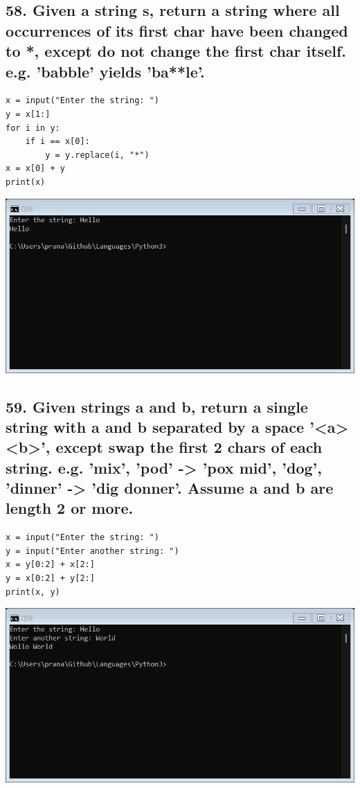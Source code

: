 \documentclass[12pt]{article}
\begin{document}
\subsection*{58. Given a string s, return a string where all occurrences of its first char have been changed to *, except do not change the first char itself. e.g. 'babble' yields 'ba**le'.}
\begin{verbatim}
x = input("Enter the string: ")
y = x[1:]
for i in y:
    if i == x[0]:
        y = y.replace(i, "*")
x = x[0] + y
print(x)
\end{verbatim}
\includegraphics[width=\linewidth]{images/58.png}

\subsection*{59. Given strings a and b, return a single string with a and b separated by a space '<a> <b>', except swap the first 2 chars of each string. e.g. 'mix', 'pod' -> 'pox mid', 'dog', 'dinner' -> 'dig donner'. Assume a and b are length 2 or more.}
\begin{verbatim}
x = input("Enter the string: ")
y = input("Enter another string: ")
x = y[0:2] + x[2:]
y = x[0:2] + y[2:]
print(x, y)
\end{verbatim}
\includegraphics[width=\linewidth]{images/59.png}
\end{document}
